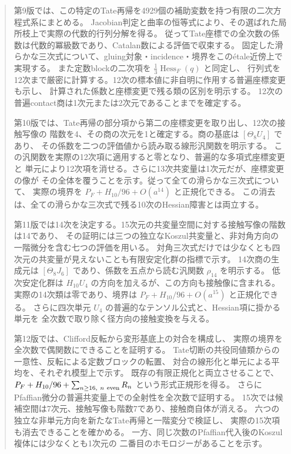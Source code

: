 \documentclass[a4paper,11pt]{ltjsarticle}
\theoremstyle{definition}
\begin{document}
\begin{abstract}
第9版では、この特定のTate再帰を4929個の補助変数を持つ有限の二次方程式系にまとめる。
Jacobian判定と曲率の恒等式により、その選ばれた局所枝上で実際の代数的行列分解を得る。
従ってTate座標での全次数の係数は代数的冪級数であり、Catalan数による評価で収束する。
固定した滑らかな三次式について、gluing対象・incidence・境界をこのétale近傍上で実現する。
また定数blockの二次項を $\frac13\operatorname{Hess}_F(q)$ と同定し、
行列式を12次まで厳密に計算する。12次の標本値に非自明に作用する普遍座標変更も示し、
計算された係数と座標変更で残る類の区別を明示する。
12次の普遍contact商は1次元または2次元であることまでを確定する。

第10版では、Tate再帰の部分項から第二の座標変更を取り出し、12次の接触写像の
階数を4、その商の次元を1と確定する。商の基底は $[\Theta_8U_4]$ であり、
その係数を二つの評価値から読み取る線形汎関数を明示する。
この汎関数を実際の12次項に適用すると零となり、普遍的な多項式座標変更と
単元により12次項を消せる。さらに13次共変量は1次元だが、座標変更の像が
その全体を覆うことを示す。従って全ての滑らかな三次式について、
実際の境界を $P_F+H_{10}/96+O(a^{14})$ と正規化できる。
この消去は、全ての滑らかな三次式で残る10次のHessian障害とは両立する。



第11版では14次を決定する。15次元の共変量空間に対する接触写像の階数は14であり、
その証明には三つの独立なKoszul共変量と、非対角方向の一階微分を含む七つの評価を用いる。
対角三次式だけでは少なくとも四次元の共変量が見えないことも有限安定化群の指標で示す。
14次商の生成元は $[\Theta_8J_6]$ であり、係数を五点から読む汎関数 $\rho_{14}$ を明示する。
低次安定化群は $H_{10}U_4$ の方向を加えるが、この方向も接触像に含まれる。
実際の14次類は零であり、境界は $P_F+H_{10}/96+O(a^{15})$ と正規化できる。
さらに四次単元 $U_4$ の普遍的なテンソル公式と、Hessian項に掛かる単元を
全次数で取り除く径方向の接触変換を与える。

第12版では、Clifford反転から変形基底上の対合を構成し、
実際の境界を全次数で偶関数にできることを証明する。
Tate切断の共役同値類からの一意性、反転による定数ブロックの転置、
対合の線形化と単元による平均を、それぞれ模型上で示す。
既存の有限正規化と両立させることで、
$P_F+H_{10}/96+\sum_{n\ge16,\ n\ {\rm even}}R_n$ という形式正規形を得る。
さらにPfaffian微分の普遍共変量上での全射性を全次数で証明する。
15次では候補空間は7次元、接触写像も階数7であり、接触商自体が消える。
六つの独立な非単元方向を新たなTate再帰と一階変分で検証し、
実際の15次項も消去できることを確かめる。
一方、同じ次数のPfaffian代入後のKoszul複体には少なくとも1次元の
二番目のホモロジーがあることを示す。



\end{abstract}
\end{document}

